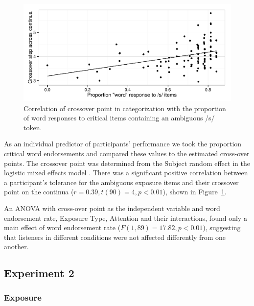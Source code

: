 \documentclass[11pt]{article}\usepackage[]{graphicx}\usepackage[]{color}
\begin{document}
\begin{figure}[!ht]

\caption{Correlation of crossover point in categorization with the proportion of word responses to critical items containing an ambiguous /s/ token.}\label{fig:exp1xover}
\begin{center}
\includegraphics[width=\textwidth]{graphs/exp1_xoverwordresp}
\end{center}
\end{figure}

As an individual predictor of participants' performance we took the proportion critical word endorsements and compared these values to the estimated cross-over points. 
The crossover point was determined from the Subject random effect in the logistic mixed effects model \citep{Kleber2011}. 
There was a significant positive correlation between a participant's tolerance for the ambiguous exposure items and their crossover point on the continua ($r = 0.39, t (90) = 4, p < 0.01$), shown in Figure~\ref{fig:exp1xover}.

An ANOVA with cross-over point as the independent variable and word endorsement rate, Exposure Type, Attention and their interactions, found only a main effect of word endorsement rate ($F(1,89) = 17.82, p < 0.01$), suggesting that listeners in different conditions were not affected differently from one another.


\subsection{Experiment 2}

\subsubsection{Exposure}
\end{document}

